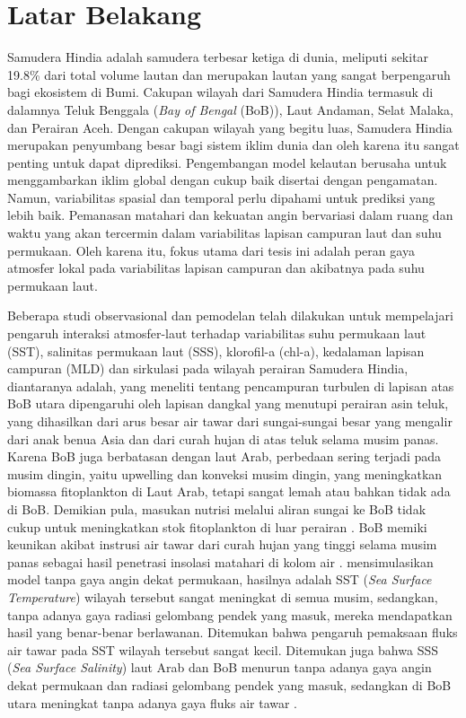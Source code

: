 \vspace{1.5pc}
\section[Latar Belakang]{Latar Belakang}
\begin{spacing}{1.5}
	Samudera Hindia adalah samudera terbesar ketiga di dunia, meliputi sekitar 19.8\% dari total volume lautan  dan merupakan lautan yang sangat berpengaruh bagi ekosistem di Bumi. Cakupan wilayah dari Samudera Hindia termasuk di dalamnya Teluk Benggala (\textit{Bay of Bengal} (BoB)), Laut Andaman, Selat Malaka, dan Perairan Aceh. Dengan cakupan wilayah yang begitu luas, Samudera Hindia merupakan penyumbang besar bagi sistem iklim dunia dan oleh karena itu sangat penting untuk dapat diprediksi. Pengembangan model kelautan berusaha untuk menggambarkan iklim global dengan cukup baik disertai dengan pengamatan. Namun, variabilitas spasial dan temporal perlu dipahami untuk prediksi yang lebih baik. Pemanasan matahari dan kekuatan angin bervariasi dalam ruang dan waktu yang akan tercermin dalam variabilitas lapisan campuran laut dan suhu permukaan. Oleh karena itu, fokus utama dari tesis ini adalah peran gaya atmosfer lokal pada variabilitas lapisan campuran dan akibatnya pada suhu permukaan laut.
	
	Beberapa studi observasional dan pemodelan telah dilakukan untuk mempelajari pengaruh interaksi atmosfer-laut terhadap variabilitas suhu permukaan laut (SST), salinitas permukaan laut (SSS), klorofil-a (chl-a), kedalaman lapisan campuran (MLD) dan sirkulasi pada wilayah perairan Samudera Hindia, diantaranya adalah,  yang meneliti tentang pencampuran turbulen di lapisan atas BoB utara dipengaruhi oleh lapisan dangkal yang menutupi perairan asin teluk, yang dihasilkan dari arus besar air tawar dari sungai-sungai besar yang mengalir dari anak benua Asia dan dari curah hujan di atas teluk selama musim panas. Karena BoB juga berbatasan dengan laut Arab, perbedaan sering terjadi pada musim dingin, yaitu upwelling dan konveksi musim dingin, yang meningkatkan biomassa fitoplankton di Laut Arab, tetapi sangat lemah atau bahkan tidak ada di BoB. Demikian pula, masukan nutrisi melalui aliran sungai ke BoB tidak cukup untuk meningkatkan stok fitoplankton di luar perairan . BoB memiki keunikan akibat instrusi air tawar dari curah hujan yang tinggi selama musim panas sebagai hasil penetrasi insolasi matahari di kolom air \cite{Kantha2019}.  mensimulasikan model tanpa gaya angin dekat permukaan, hasilnya adalah SST (\textit{Sea Surface Temperature}) wilayah tersebut sangat meningkat di semua musim, sedangkan, tanpa adanya gaya radiasi gelombang pendek yang masuk, mereka mendapatkan hasil yang benar-benar berlawanan. Ditemukan bahwa pengaruh pemaksaan fluks air tawar pada SST wilayah tersebut sangat kecil. Ditemukan juga bahwa SSS (\textit{Sea Surface Salinity}) laut Arab dan BoB menurun tanpa adanya gaya angin dekat permukaan dan radiasi gelombang pendek yang masuk, sedangkan di BoB utara meningkat tanpa adanya gaya fluks air tawar .
	

\end{spacing}

